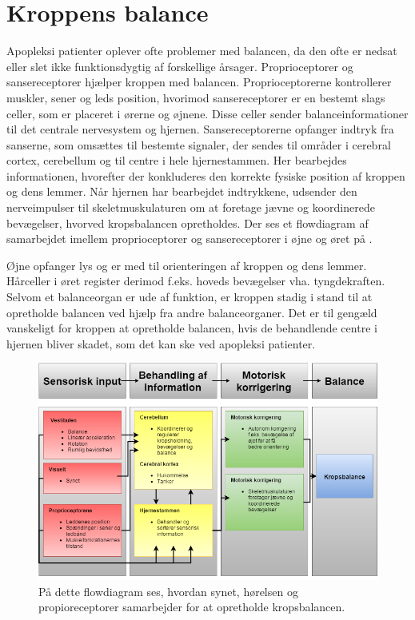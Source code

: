 \chapter{Kroppens balance}\label{app-Balance}
Apopleksi patienter oplever ofte problemer med balancen, da den ofte er nedsat eller slet ikke funktionsdygtig af forskellige årsager. \cite{Karnath2003} Proprioceptorer og sansereceptorer hjælper kroppen med balancen. Proprioceptorerne kontrollerer muskler, sener og leds position, hvorimod sansereceptorer er en bestemt slags celler, som er placeret i ørerne og øjnene. \cite{Martini2012} Disse celler sender balanceinformationer til det centrale nervesystem og hjernen. Sansereceptorerne opfanger indtryk fra sanserne, som omsættes til bestemte signaler, der sendes til områder i cerebral cortex, cerebellum og til centre i hele hjernestammen. Her bearbejdes informationen, hvorefter der konkluderes den korrekte fysiske position af kroppen og dens lemmer. Når hjernen har bearbejdet indtrykkene, udsender den nerveimpulser til skeletmuskulaturen om at foretage jævne og koordinerede bevægelser, hvorved kropsbalancen opretholdes.\cite{Martini2012} Der ses et flowdiagram af samarbejdet imellem proprioceptorer og sansereceptorer i øjne og øret på .

Øjne opfanger lys og er med til orienteringen af kroppen og dens lemmer. Hårceller i øret register derimod f.eks. hoveds bevægelser vha. tyngdekraften. Selvom et balanceorgan er ude af funktion, er kroppen stadig i stand til at opretholde balancen ved hjælp fra andre balanceorganer. Det er til gengæld vanskeligt for kroppen at opretholde balancen, hvis de behandlende centre i hjernen bliver skadet, som det kan ske ved apopleksi patienter. \cite{Martini2012} \\
\begin{figure}[H]
	\centering
	\includegraphics[scale=0.4]{figures/bProblemanalyse/Balance-Flowdiagram.png}
	\caption{På dette flowdiagram ses, hvordan synet, hørelsen og propioreceptorer samarbejder for at opretholde kropsbalancen. }
	\label{flowbalance}
\end{figure}

